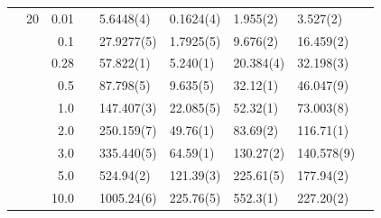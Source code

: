 \begin{table}[H]
\begin{tabularx}{\textwidth}{R{1cm}rrcR{2.3cm}R{2.3cm}R{2.3cm}R{2.3cm}R{1cm}}
		&20 & 0.01 && 5.6448(4) & 0.1624(4) & 1.955(2) & 3.527(2) \\
		&& 0.1 && 27.9277(5) & 1.7925(5) & 9.676(2) & 16.459(2) \\
		&& 0.28 && 57.822(1) & 5.240(1) & 20.384(4) & 32.198(3) \\
		&& 0.5 && 87.798(5) & 9.635(5) & 32.12(1) & 46.047(9) \\
		&& 1.0 && 147.407(3) & 22.085(5) & 52.32(1) & 73.003(8) \\
		&& 2.0 && 250.159(7) & 49.76(1) & 83.69(2) & 116.71(1) \\
		&& 3.0 && 335.440(5) & 64.59(1) & 130.27(2) & 140.578(9) \\ 
		&& 5.0 && 524.94(2) & 121.39(3) & 225.61(5) & 177.94(2) \\
		&& 10.0 && 1005.24(6) & 225.76(5) & 552.3(1) & 227.20(2) \\
		\hline \hline
	\end{tabularx}
\end{table}

